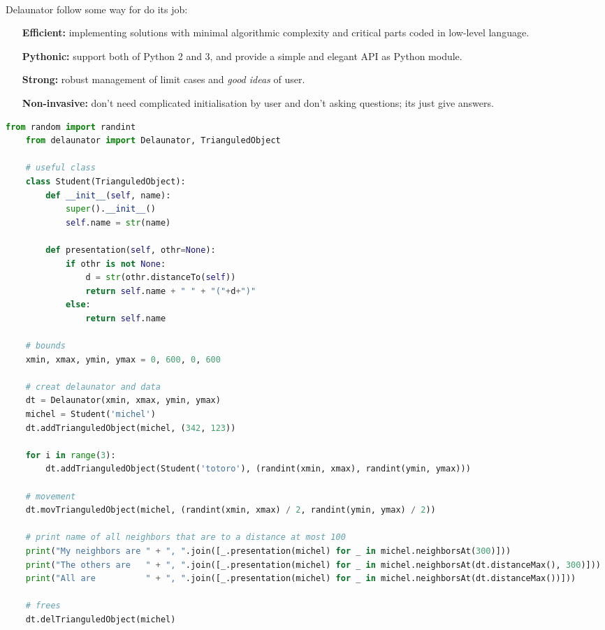 \documentclass{report}
\begin{document}
    \paragraph*{}
    Delaunator follow some way for do its job:
    \begin{enumerate}
        \item[\textbf{Efficient:}] implementing solutions with minimal algorithmic complexity and critical parts coded in low-level language.
        \item[\textbf{Pythonic:}] support both of Python 2 and 3, and provide a simple and elegant API as Python module.
        \item[\textbf{Strong:}] robust management of limit cases and \textit{good ideas} of user.
        \item[\textbf{Non-invasive:}] don't need complicated initialisation by user and don't asking questions; its just give answers.
    \end{enumerate}
    \newpage
    \begin{lstlisting}[language=python]
    from random import randint
    from delaunator import Delaunator, TrianguledObject

    # useful class
    class Student(TrianguledObject): 
        def __init__(self, name):
            super().__init__()
            self.name = str(name)

        def presentation(self, othr=None):
            if othr is not None:
                d = str(othr.distanceTo(self)) 
                return self.name + " " + "("+d+")"
            else:
                return self.name

    # bounds
    xmin, xmax, ymin, ymax = 0, 600, 0, 600

    # creat delaunator and data
    dt = Delaunator(xmin, xmax, ymin, ymax)
    michel = Student('michel')
    dt.addTrianguledObject(michel, (342, 123))

    for i in range(3):
        dt.addTrianguledObject(Student('totoro'), (randint(xmin, xmax), randint(ymin, ymax)))

    # movement
    dt.movTrianguledObject(michel, (randint(xmin, xmax) / 2, randint(ymin, ymax) / 2))

    # print name of all neighbors that are to a distance at most 100
    print("My neighbors are " + ", ".join([_.presentation(michel) for _ in michel.neighborsAt(300)]))
    print("The others are   " + ", ".join([_.presentation(michel) for _ in michel.neighborsAt(dt.distanceMax(), 300)]))
    print("All are          " + ", ".join([_.presentation(michel) for _ in michel.neighborsAt(dt.distanceMax())]))

    # frees
    dt.delTrianguledObject(michel)
    \end{lstlisting}
\end{document}
